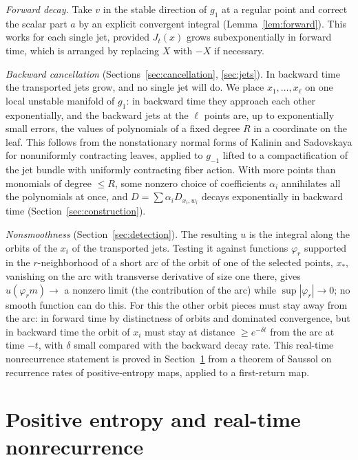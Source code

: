 \documentclass[11pt]{article}
\theoremstyle{remark}
\begin{document}
\emph{Forward decay.}  Take \(v\) in the stable direction of
\(g_1\) at a regular point and correct the scalar part \(a\)
by an explicit convergent integral (Lemma~\ref{lem:forward}).  This
works for each single jet, provided \(J_t(x)\) grows subexponentially
in forward time, which is arranged by replacing \(X\)
with \(-X\) if necessary.

\emph{Backward cancellation} (Sections~\ref{sec:cancellation},
\ref{sec:jets}).  In backward time the transported jets grow, and no
single jet will do.  We place \(x_1,\dots,x_\ell\) on one
local unstable manifold of \(g_1\): in backward time they approach
each other exponentially, and the backward jets at the \(\ell\)
points are, up to exponentially small errors, the values of
polynomials of a fixed degree \(R\) in a coordinate on the
leaf.  This follows from the nonstationary normal forms of
Kalinin and Sadovskaya \cite{KalininSadovskaya2017} for nonuniformly
contracting leaves, applied to \(g_{-1}\) lifted to a
compactification of the jet bundle with uniformly contracting fiber
action.  With more points than monomials of degree
\(\le R\), some nonzero choice of coefficients \(\alpha_i\) annihilates
all the polynomials at once, and \(D=\sum\alpha_iD_{x_i,w_i}\) decays
exponentially in backward time (Section~\ref{sec:construction}).

\emph{Nonsmoothness} (Section~\ref{sec:detection}).  The resulting
\(u\) is the integral along the orbits of the \(x_i\) of the
transported jets.  Testing it against functions \(\varphi_r\)
supported in the \(r\)-neighborhood of a short arc of the orbit of
one of the selected points, \(x_*\), vanishing on the arc with
transverse derivative of size one there, gives \(u(\varphi_rm)\to\)
a nonzero limit (the contribution of the arc) while
\(\sup|\varphi_r|\to0\); no smooth function can do this.  For this
the other orbit pieces must stay away from the arc:
in forward time by distinctness of orbits and dominated convergence,
but in backward time the orbit of \(x_i\) must stay at distance
\(\ge e^{-\delta t}\) from the arc at time \(-t\), with \(\delta\)
small compared with the backward decay rate.  This real-time
nonrecurrence statement is proved in Section~\ref{sec:recurrence}
from a theorem of Saussol \cite{Saussol2004} on recurrence rates of
positive-entropy maps, applied to a first-return map.

\section{Positive entropy and real-time nonrecurrence}
\label{sec:recurrence}
\end{document}
